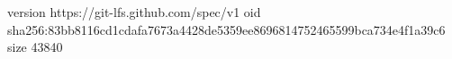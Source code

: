 version https://git-lfs.github.com/spec/v1
oid sha256:83bb8116cd1cdafa7673a4428de5359ee8696814752465599bca734e4f1a39c6
size 43840
